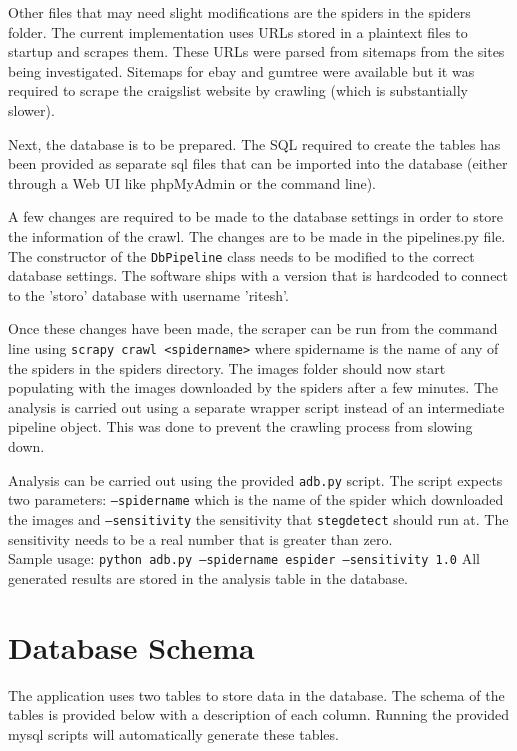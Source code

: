 \singlespacing

Other files that may need slight modifications are the spiders in the spiders folder. The current implementation uses URLs stored in a plaintext files to startup and scrapes them. These URLs were parsed from sitemaps from the sites being investigated. Sitemaps for ebay and gumtree were available but it was required to scrape the craigslist website by crawling (which is substantially slower). 

Next, the database is to be prepared. The SQL required to create the tables has been provided as separate sql files that can be imported into the database (either through a Web UI like phpMyAdmin or the command line). 

A few changes are required to be made to the database settings in order to store the information of the crawl. The changes are to be made in the pipelines.py file. The constructor of the \texttt{DbPipeline} class needs to be modified to the correct database settings. The software ships with a version that is hardcoded to connect to the 'storo' database with username 'ritesh'.

Once these changes have been made, the scraper can be run from the command line using \texttt{scrapy crawl <spidername>} where spidername is the name of any of the spiders in the spiders directory. The images folder should now start populating with the images downloaded by the spiders after a few minutes.  The analysis is carried out using a separate wrapper script instead of an intermediate pipeline object. This was done to prevent the crawling process from slowing down.

Analysis can be carried out using the provided \texttt{adb.py} script. The script expects two parameters: \texttt{--spidername} which is the name of the spider which downloaded the images and \texttt{--sensitivity} the sensitivity that \texttt{stegdetect} should run at. The sensitivity needs to be a real number that is greater than zero.
\\Sample usage: \texttt{python adb.py --spidername espider --sensitivity 1.0}
All generated results are stored in the analysis table in the database.   

\chapter{Database Schema}
\label{appendix:schema}
The application uses two tables to store data in the database. The schema of the tables is provided below with a description of each column. Running the provided mysql scripts will automatically generate these tables.

